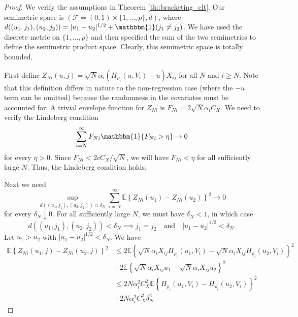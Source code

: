 \documentclass[10pt,a4paper]{amsart}
\newcommand{\E}{\mathbb{E}}
\begin{document}
\begin{proof}
    We verify the assumptions in {Theorem \ref{th::bracketing_clt}}. Our semimetric space is $(\mathcal{F} = (0,1)\times \{1,\ldots, p\}, d)$, where $d((u_{1},j_{1}),(u_{2},j_{2})) = |u_{1}-u_{2}|^{1/2} + \mathbbm{1}(j_{1} \neq j_{2})$. We have used the discrete metric on $\{1,\ldots, p\}$ and then specified the sum of the two semimetrics to define the semimetric product space. Clearly, this semimetric space is totally bounded.

First define $Z_{Ni}(u, j) = \sqrt{N}\alpha_{i}(H_{\rho_{i}}(u,V_{i})-u)X_{ij}$ for all $N$ and $i \geq N$. Note that this definition differs in nature to the non-regression case (where the $-u$ term can be omitted) because the randomness in the covariates must be accounted for. A trivial envelope function for $Z_{Ni}$ is $F_{Ni} = 2\sqrt{N}\alpha_{i}C_{X}$. We need to verify the Lindeberg condition
\begin{equation*}
    \sum_{i=N}^{\infty} F_{Ni}\mathbbm{1}\{F_{Ni} > \eta\} \rightarrow 0
\end{equation*}
for every $\eta > 0$. Since $F_{Ni} < 2cC_{X}/\sqrt{N}$, we will have $F_{Ni} < \eta$ for all sufficiently large $N$. Thus, the Lindeberg condition holds.

Next we need 
\begin{equation*}
    \sup_{d((u_{1},j_{1}),(u_{2},j_{2})) < \delta_{N}} \sum_{i=N}^{\infty} \E\left\{Z_{Ni}(u_{1})-Z_{Ni}(u_{2})\right\}^{2} \rightarrow 0
\end{equation*}
for every $\delta_{N} \downarrow 0$. For all sufficiently large $N$, we must have $\delta_{N} < 1$, in which case
\begin{equation*}
    d((u_{1},j_{1}),(u_{2},j_{2})) < \delta_{N} \implies j_{1} = j_{2} \quad \text{and} \quad |u_{1} - u_{2}|^{1/2} < \delta_{N}.
\end{equation*}
Let $u_{1} > u_{2}$ with $|u_{1} - u_{2}|^{1/2}  < \delta_{N}$. We have
\begin{align*}
     \E\left\{Z_{Ni}(u_{1}, j)-Z_{Ni}(u_{2},j)\right\}^{2}&\leq  2\E\left\{\sqrt{N}\alpha_{i}X_{ij}H_{\rho_{i}}(u_{1},V_{i})-\sqrt{N}\alpha_{i}X_{ij}H_{\rho_{i}}(u_{2},V_{i})\right\}^{2} \\
     &+ 2\E\left\{\sqrt{N}\alpha_{i}X_{ij}u_{1}-\sqrt{N}\alpha_{i}X_{ij}u_{2}\right\}^{2}\\
     &\leq  2N\alpha_{i}^{2}C_{X}^{2}\E\left\{H_{\rho_{i}}(u_{1},V_{i})-H_{\rho_{i}}(u_{2},V_{i})\right\}^{2} \\
     &+ 2N\alpha_{i}^{2}C_{X}^{2}\delta_{N}^{2}
\end{align*}


\end{proof}
\end{document}
